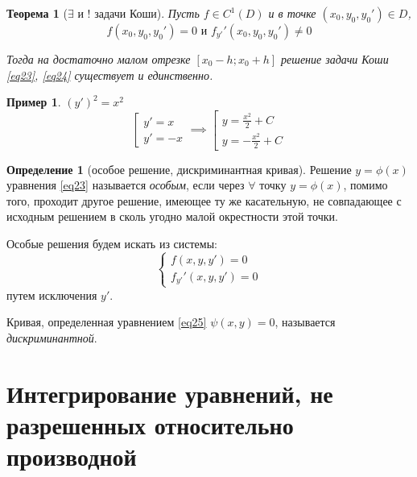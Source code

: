 \documentclass[11pt,a4paper,oneside]{report}
\theoremstyle{definition}
\newtheorem{definition}{Определение}[section]
\newtheorem{example}{Пример}
\theoremstyle{plain}
\newtheorem{theorem}{Теорема}[section]
\theoremstyle{remark}
\begin{document}
\begin{theorem}[$\exists$ и $!$ задачи Коши]
    Пусть $f\in C^1(D)$ и в точке $(x_0,y_0,y_0') \in D$,
    \begin{equation*}
        f(x_0,y_0,y_0') = 0\text{ и }f_{y'}'(x_0,y_0,y_0')\ne0
    \end{equation*}

    Тогда на достаточно малом отрезке $[x_0 - h;x_0 + h]$ решение задачи Коши \ref{eq23}, \ref{eq24} существует и единственно.
\end{theorem}

\begin{example}
    $(y')^2 = x^2$
    \begin{equation*}
        \left[\begin{array}{l}
            y' = x \\
            y' = -x
        \end{array}\right. \implies \left[\begin{array}{l}
            y = \frac{x^2}{2} + C \\
            y = - \frac{x^2}{2} + C
        \end{array}\right.
    \end{equation*}
\end{example}

\begin{definition}[особое решение, дискриминантная кривая]
    Решение $y = \phi(x)$ уравнения \ref{eq23} называется \emph{особым}, если через $\forall$ точку $y = \phi(x)$, помимо того, проходит другое решение, имеющее ту же касательную, не совпадающее с исходным решением в сколь угодно малой окрестности этой точки.

    Особые решения будем искать из системы:
    \begin{equation}\label{eq25}
        \left\{\begin{array}{l}
            f(x,y,y') = 0 \\
            f_{y'}'(x,y,y') = 0
        \end{array}\right.
    \end{equation}
    путем исключения $y'$.

    Кривая, определенная уравнением \ref{eq25} $\psi(x,y) = 0$, называется \emph{дискриминантной}.
\end{definition}

\section{Интегрирование уравнений, не разрешенных относительно производной}
\end{document}
